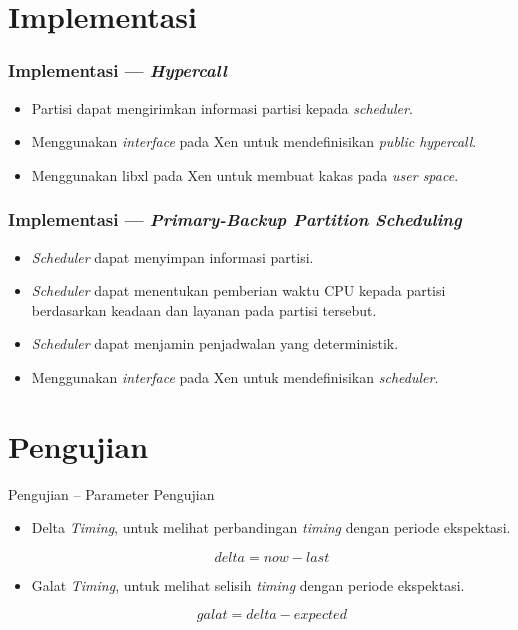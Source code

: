 \documentclass[xetex]{beamer}
\begin{document}
\section{Implementasi}
\begin{frame}
	\frametitle{Implementasi --- \textit{Hypercall}}
	\begin{itemize}
		\item Partisi dapat mengirimkan informasi partisi kepada \textit{scheduler}.
		\item Menggunakan \textit{interface} pada Xen untuk mendefinisikan \textit{public hypercall}.
		\item Menggunakan libxl pada Xen untuk membuat kakas pada \textit{user space}.
	\end{itemize}
\end{frame}
\begin{frame}
	\frametitle{Implementasi --- \textit{Primary-Backup Partition Scheduling}}
	\begin{itemize}
		\item \textit{Scheduler} dapat menyimpan informasi partisi.
		\item \textit{Scheduler} dapat menentukan pemberian waktu CPU kepada partisi berdasarkan keadaan dan layanan pada partisi tersebut.
		\item \textit{Scheduler} dapat menjamin penjadwalan yang deterministik.
		\item Menggunakan \textit{interface} pada Xen untuk mendefinisikan \textit{scheduler}.
	\end{itemize}
\end{frame}
\section{Pengujian}

\begin{frame}{Pengujian -- Parameter Pengujian}
	\begin{itemize}
		\item Delta \textit{Timing}, untuk melihat perbandingan \textit{timing} dengan periode ekspektasi.

			\begin{equation*}
				delta = now - last
			\end{equation*}

		\item Galat \textit{Timing}, untuk melihat selisih \textit{timing} dengan periode ekspektasi.

			\begin{equation*}
				galat = delta - expected
			\end{equation*}


	\end{itemize}
\end{frame}
\end{document}
